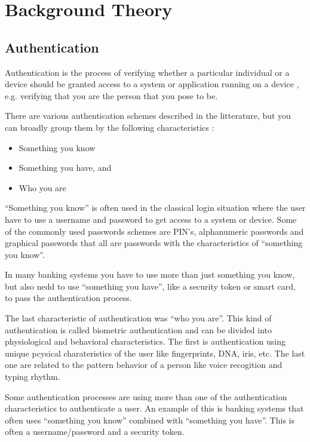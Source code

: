 \section{Background Theory}

  \subsection{Authentication}

  Authentication is the process of verifying whether a particular individual or a device should be granted access to a system or application running on a device \cite{IPAS}, e.g. verifying that you are the person that you pose to be.

  There are various authentication schemes described in the litterature, but you can broadly group them by the following characteristics \cite{IPAS}:

    \begin{itemize}
      \item Something you know
      \item Something you have, and
      \item Who you are
    \end{itemize}

  ``Something you know'' is often used in the classical login situation where the user have to use a username and password to get access to a system or device. Some of the commonly used passwords schemes are PIN's, alphanumeric passwords and graphical passwords that all are passwords with the characteristics of ``something you know''.

  In many banking systems you have to use more than just something you know, but also nedd to use ``something you have'', like a security token or smart card, to pass the authentication process. 

  The last characteristic of authentication was ``who you are''. This kind of authentication is called biometric authentication and can be divided into physiological and behavioral characteristics. The first is authentication using unique pcysical charateristics of the user like fingerprints, DNA, iris, etc. The last one are related to the pattern behavior of a person like voice recogition and typing rhythm. 

  Some authentication processes are using more than one of the authentication characteristics to authenticate a user. An example of this is banking systems that often uses ``something you know'' combined with ``something you have''. This is often a username/password and a security token. 

